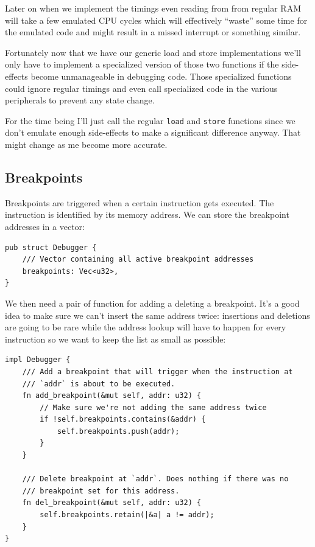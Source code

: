 \documentclass[a4paper]{article}
\newcommand{\code}[1] {\texttt{#1}}
\begin{document}
Later on when we implement the timings even reading from from regular
RAM will take a few emulated CPU cycles which will effectively
``waste'' some time for the emulated code and might result in a missed
interrupt or something similar.

Fortunately now that we have our generic load and store
implementations we'll only have to implement a specialized version of
those two functions if the side-effects become unmanageable in
debugging code. Those specialized functions could ignore regular
timings and even call specialized code in the various peripherals to
prevent any state change.

For the time being I'll just call the regular \code{load} and
\code{store} functions since we don't emulate enough side-effects to
make a significant difference anyway. That might change as me become
more accurate.

\subsection{Breakpoints}

Breakpoints are triggered when a certain instruction gets
executed. The instruction is identified by its memory address. We can
store the breakpoint addresses in a vector:

\begin{lstlisting}
pub struct Debugger {
    /// Vector containing all active breakpoint addresses
    breakpoints: Vec<u32>,
}
\end{lstlisting}

We then need a pair of function for adding a deleting a
breakpoint. It's a good idea to make sure we can't insert the same
address twice: insertions and deletions are going to be rare while the
address lookup will have to happen for every instruction so we want to
keep the list as small as possible:

\begin{lstlisting}
impl Debugger {
    /// Add a breakpoint that will trigger when the instruction at
    /// `addr` is about to be executed.
    fn add_breakpoint(&mut self, addr: u32) {
        // Make sure we're not adding the same address twice
        if !self.breakpoints.contains(&addr) {
            self.breakpoints.push(addr);
        }
    }

    /// Delete breakpoint at `addr`. Does nothing if there was no
    /// breakpoint set for this address.
    fn del_breakpoint(&mut self, addr: u32) {
        self.breakpoints.retain(|&a| a != addr);
    }
}
\end{lstlisting}
\end{document}

